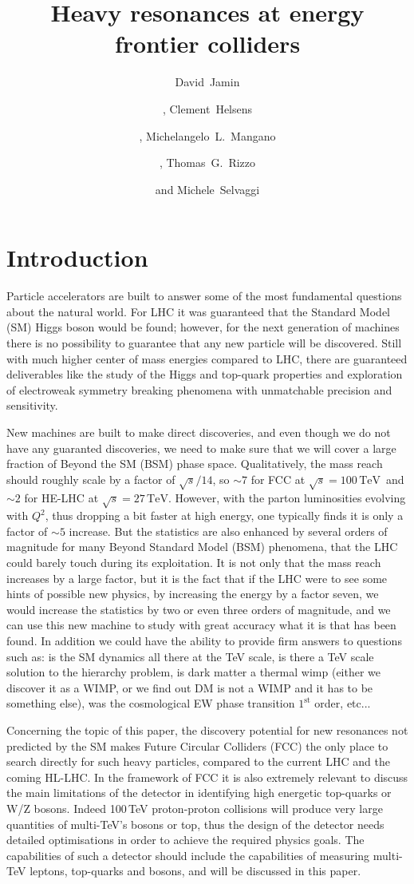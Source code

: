\documentclass[a4paper,11pt]{article}
\title{\boldmath Heavy resonances at energy frontier colliders}
\author[a,c]{David~Jamin}
\author[a]{\!\!, Clement~Helsens}
\author[a]{\!\!, Michelangelo~L.~Mangano}
\author[b]{\!\!, Thomas~G.~Rizzo}
\author[a]{and Michele~Selvaggi}
\affiliation[a]{CERN, CH-1211 Geneva 23, Switzerland}
\affiliation[b]{SLAC National Accelerator Laboratory 2575 Sand Hill Rd., Menlo Park, CA, 94025 USA}
\affiliation[c]{Academia Sinica, Institute of  Physics, Taipei, Taiwan}
\newcommand*{\sqrtshelhc}{\ensuremath{\sqrt{s}=27\,\text{TeV}}}
\newcommand*{\sqrtsfcc}{\ensuremath{\sqrt{s}=100\,\text{TeV}}}
\begin{document}
\maketitle
\flushbottom

\section{Introduction}
\label{sec:intro}
Particle accelerators are built to answer some of the most fundamental questions about the natural world. For LHC it was guaranteed that the Standard Model (SM) Higgs boson would be found; however, for the next generation of machines there is no possibility to guarantee that any new particle will be discovered. Still with much higher center of mass energies compared to LHC, there are guaranteed deliverables like the study of the Higgs and top-quark properties and exploration of electroweak symmetry breaking phenomena with unmatchable precision and sensitivity.

New machines are built to make direct discoveries, and even though we do not have any guaranted discoveries, we need to make sure that we will cover a large fraction of Beyond the SM (BSM) phase space. Qualitatively, the mass reach should roughly scale by a factor of $\sqrt{s}/14$, so $\sim 7$ for FCC at \sqrtsfcc\ and $\sim 2$ for HE-LHC at \sqrtshelhc. However, with the parton luminosities evolving with $Q^2$, thus dropping a bit faster at high energy, one typically finds it is only a factor of $\sim 5$ increase. But the statistics are also enhanced by several orders of magnitude for many Beyond Standard Model (BSM) phenomena, that the LHC could barely touch during its exploitation. It is not only that the mass reach increases by a large factor, but it is the fact that if the LHC were to see some hints of possible new physics, by increasing the energy by a factor seven, we would increase the statistics by two or even three orders of magnitude, and we can use this new machine to study with great accuracy what it is that has been found. In addition we could have the ability to provide firm answers to questions such as: is the SM dynamics all there at the TeV scale, is there a TeV scale solution to the hierarchy problem, is dark matter a thermal wimp (either we discover it as a WIMP, or we find out DM is not a WIMP and it has to be something else), was the cosmological EW phase transition $1^{\mathrm{st}}$ order, etc...

Concerning the topic of this paper, the discovery potential for new resonances not predicted by the SM makes Future Circular Colliders (FCC) the only place to search directly for such heavy particles, compared to the current LHC and the coming HL-LHC.
In the framework of FCC it is also extremely relevant to discuss the main limitations of the detector in identifying high energetic top-quarks or W/Z bosons. Indeed 100\,TeV proton-proton collisions will produce very large quantities of multi-TeV's bosons or top, thus the design of the detector needs detailed optimisations in order to achieve the required physics goals. The capabilities of such a detector should include the capabilities of measuring multi-TeV leptons, top-quarks and bosons, and will be discussed in this paper.
\end{document}
